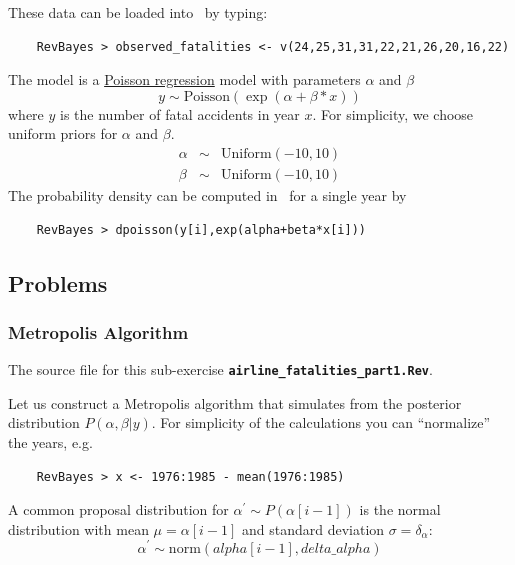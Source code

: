 \documentclass[11pt]{article}
\newcommand{\cl}[1]{{\texttt{\textbf{#1}}}}
\begin{document}
These data can be loaded into \RevBayes~by typing:
{\tt \begin{snugshade*}
\begin{lstlisting}    
    RevBayes > observed_fatalities <- v(24,25,31,31,22,21,26,20,16,22)
\end{lstlisting}
\end{snugshade*}}

The model is a \href{http://en.wikipedia.org/wiki/Poisson_regression}{Poisson regression} model with parameters $\alpha$ and $\beta$
\begin{equation*}
y \sim \text{Poisson}(\exp(\alpha+\beta*x))
\end{equation*} 
where $y$ is the number of fatal accidents in year $x$. 
For simplicity, we choose uniform priors for $\alpha$ and $\beta$.
\begin{eqnarray*}
\alpha & \sim & \text{Uniform}(-10,10)\\
\beta &  \sim & \text{Uniform}(-10,10)
\end{eqnarray*}
The probability density can be computed in \RevBayes~for a single year by
{\tt \begin{snugshade*}
\begin{lstlisting}    
    RevBayes > dpoisson(y[i],exp(alpha+beta*x[i]))
\end{lstlisting}
\end{snugshade*}}

\subsection*{Problems}

\subsubsection*{Metropolis Algorithm}%

The source file for this sub-exercise \cl{airline\_fatalities\_part1.Rev}.

Let us construct a Metropolis algorithm that simulates from the posterior distribution $P(\alpha,\beta|y)$. 
For simplicity of the calculations you can ``normalize'' the years, e.g. 
{\tt \begin{snugshade*}
\begin{lstlisting}    
    RevBayes > x <- 1976:1985 - mean(1976:1985)
\end{lstlisting}
\end{snugshade*}}

A common proposal distribution for $\alpha^{\prime} \sim P(\alpha[i-1])$ is the normal distribution with mean $\mu = \alpha[i-1]$ and standard deviation $\sigma = \delta_\alpha$:
\begin{equation}
\alpha^{\prime} \sim \text{norm}(alpha[i-1],delta\_alpha)
\end{equation}
\end{document}

